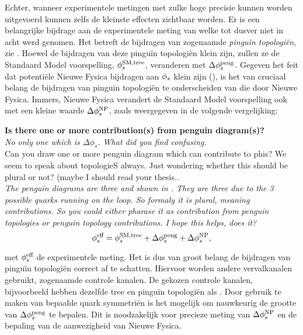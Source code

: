 Echter, wanneer experimentele metingen met zulke hoge precisie kunnen worden uitgevoerd
kunnen zelfs de kleinste effecten zichtbaar worden. Er is een belangrijke bijdrage aan de
experimentele meting van \phis welke tot dusver niet in acht werd genomen. Het betreft de
bijdragen van zogenaamde {\it pingu\"in topologi\"en}, zie  .
Hoewel de bijdragen van deze pingu\"in topologi\"en klein zijn, zullen ze de Standaard Model
voorspelling, $\phi_{s}^{\tiny \text{SM,tree}}$, veranderen met $\Delta\phi_{s}^{\tiny\text{peng}}$. Gegeven het
feit dat potenti\"ele Nieuwe Fysica bijdragen aan $\phi_{s}$ klein zijn (),
is het van cruciaal belang de bijdragen van pinguin topologi\"en te onderscheiden van die door Nieuwe Fysica.
Immers, Nieuwe Fysica verandert de Standaard Model voorspelling ook met een kleine waarde
 $\Delta\phi_{s}^{\tiny \text{NP}}$, zoals weergegeven in de volgende vergelijking:

\textbf{Is there one or more contribution(s) from penguin diagram(s)?}\\

{\color{green}\it No only one which is $\Delta \phi_s$. What did you find confusing.}\\

{\color{red} Can you draw one or more penguin diagram which can contribute to phis?
We seem to speak about topologieS always. Just wondering whether this should be plural or not?
(maybe I should read your thesis.. }\\

{\color{green}\it The penguin diagrams are three and shown in .
They are three due to the 3 possible quarks running on the loop. So formaly it is plural, meaning contributions.
So you could either pharase it as contribution from penguin topologies or penguin topology contributions. I hope this helps, does it? }\\

\begin{equation}
\centering
 \phis^{\text {eff}} = \phis^{\tiny \text{SM,tree}} + \Delta\phiS{peng} + \Delta\phis^{\tiny \text{NP}},
 \label{app_nl_phis_sm_peng}
\end{equation}


\noindent met $\phi_{s}^{\text {eff}}$ de experimentele \phis meting. Het is dus van groot belang de
bijdragen van pingu\"in topologi\"en correct af te schatten. Hiervoor worden andere \Bs vervalkanalen gebruikt,
 zogenaamde controle kanalen. De gekozen controle kanalen, bijvoorbeeld \BsJpsiKst hebben dezelfde tree en
  pingu\"in topologi\"en als \BsJpsiPhi. Door gebruik te maken van bepaalde quark symmetri\"en is het
  mogelijk om nauwkeurig de grootte van $\Delta\phi_{s}^{\tiny\text{peng}}$ te bepalen. Dit is noodzakelijk voor precieze
  meting van $\Delta\phi_{s}^{\tiny \text{NP}}$ en de bepaling van de aanwezigheid van Nieuwe Fysica.



